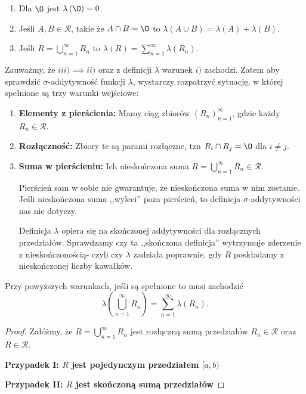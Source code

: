 \begin{enumerate}[label=\roman*)]
	\item Dla $\O$ jest $\lambda \left( \O \right) = 0$.
	\item Jeśli $A,B \in \mathcal{R}$, takie że $A\cap B= \O$ to $\lambda \left( A\cup B \right) = \lambda \left( A \right) + \lambda\left( B \right) $.
	\item Jeśli $R = \bigcup_{n=1} ^{\infty}R_{n}$ to $\lambda\left( R \right) = \sum_{n = 1}^{\infty} \lambda\left( R_{n} \right) $.
\end{enumerate}
Zauważmy, że $iii) \implies ii)$ oraz z definicji $\lambda$ warunek $i)$ zachodzi. Zatem aby sprawdzić $\sigma$-addytywność funkcji $\lambda$, wystarczy rozpatrzyć sytuację, w której spełnione są trzy warunki wejściowe:
\begin{enumerate}[label=\arabic*.]
	\item \textbf{Elementy z pierścienia:} Mamy ciąg zbiorów $\left( R_{n} \right) _{n=1}^{\infty}$, gdzie każdy $R_{n}\in \mathcal{R}$.
	\item \textbf{Rozłączność:} Zbiory te są parami rozłączne, tzn $R_{i}\cap R_{j} = \O$ dla $i\neq j$.
	\item \textbf{Suma w pierścieniu: } Ich nieskończona suma $R = \bigcup_{n=1} ^{\infty}R_{n}\in \mathcal{R}$.
		\begin{remark}
			Pierścień sam w sobie nie gwarantuje, że nieskończona suma w nim zostanie. Jeśli nieskończona suma ,,wyleci'' poza pierścień, to definicja $\sigma$-addytywności nas nie dotyczy.
                    
			Definicja $\lambda$ opiera się na skończonej addytywności dla rozłącznych przedziałów. Sprawdzamy czy ta ,,skończona definicja'' wytrzymuje zderzenie z nieskończonością- czyli czy $\lambda$ zadziała poprawnie, gdy $R$ poskładamy z nieskończonej liczby kawałków.
		\end{remark} 
\end{enumerate}

Przy powyższych warunkach, jeśli są spełnione to musi zachodzić
\[
\lambda\left( \bigcup_{n=1} ^{\infty}R_{n} \right) = \sum_{n = 1}^{\infty} \lambda\left( R_{n} \right) 
.\] 
\begin{proof}
Załóżmy, że $R=\bigcup_{n=1} ^{\infty}R_{n}$ jest rozłączną sumą przedziałów $R_{n}\in \mathcal{R}$ oraz $R \in \mathcal{R}$.

\textbf{Przypadek I: $R$ jest pojedynczym przedziałem $[a,b)$}

\textbf{Przypadek II: $R$ jest skończoną sumą przedziałów} 
\end{proof} 
